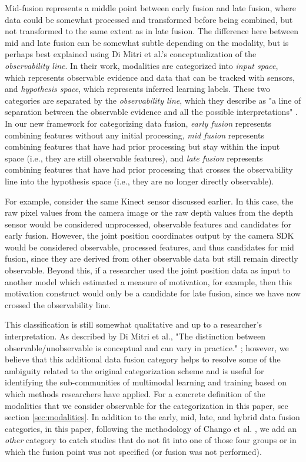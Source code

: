 \documentclass[manuscript,screen,review]{acmart}
\begin{document}
Mid-fusion represents a middle point between early fusion and late fusion, where data could be somewhat processed and transformed before being combined, but not transformed to the same extent as in late fusion. The difference here between mid and late fusion can be somewhat subtle depending on the modality, but is perhaps best explained using Di Mitri et al.’s \cite{DiMitri2018} conceptualization of the \textit{observability line}. In their work, modalities are categorized into \textit{input space}, which represents observable evidence and data that can be tracked with sensors, and \textit{hypothesis space}, which represents inferred learning labels. These two categories are separated by the \textit{observability line}, which they describe as "a line of separation between the observable evidence and all the possible interpretations" \cite{DiMitri2018}. In our new framework for categorizing data fusion, \textit{early fusion} represents combining features without any initial processing, \textit{mid fusion} represents combining features that have had prior processing but stay within the input space (i.e., they are still observable features), and \textit{late fusion} represents combining features that have had prior processing that crosses the observability line into the hypothesis space (i.e., they are no longer directly observable).

For example, consider the same Kinect sensor discussed earlier. In this case, the raw pixel values from the camera image or the raw depth values from the depth sensor would be considered unprocessed, observable features and candidates for early fusion. However, the joint position coordinates output by the camera SDK would be considered observable, processed features, and thus candidates for mid fusion, since they are derived from other observable data but still remain directly observable. Beyond this, if a researcher used the joint position data as input to another model which estimated a measure of motivation, for example, then this motivation construct would only be a candidate for late fusion, since we have now crossed the observability line. 

This classification is still somewhat qualitative and up to a researcher's interpretation. As described by Di Mitri et al., "The distinction between observable/unobservable is conceptual and can vary in practice." \cite{DiMitri2018}; however, we believe that this additional data fusion category helps to resolve some of the ambiguity related to the original categorization scheme and is useful for identifying the sub-communities of multimodal learning and training based on which methods researchers have applied. For a concrete definition of the modalities that we consider observable for the categorization in this paper, see section \ref{sec:modalities}. In addition to the early, mid, late, and hybrid data fusion categories, in this paper, following the methodology of Chango et al. \cite{Chango2022}, we add an \textit{other} category to catch studies that do not fit into one of those four groups or in which the fusion point was not specified (or fusion was not performed).
\end{document}
